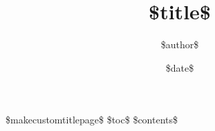 \documentclass{article}
\begin{document}
\title{\$title\$} 
\author{\$author\$}
\date{\$date\$}

\$makecustomtitlepage\$
\$toc\$
\$contents\$
\end{document}
